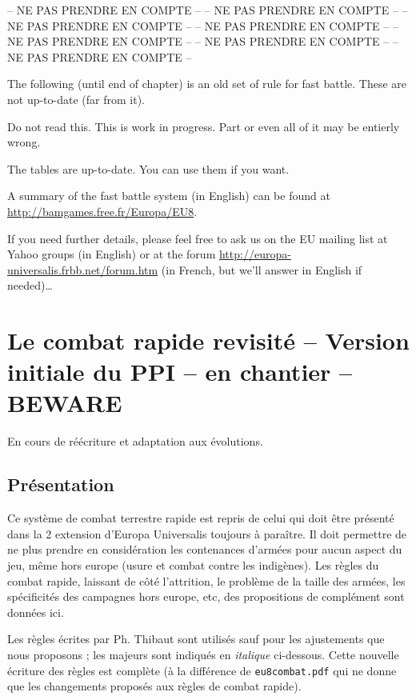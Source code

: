 
-- NE PAS PRENDRE EN COMPTE --
-- NE PAS PRENDRE EN COMPTE --
-- NE PAS PRENDRE EN COMPTE --
-- NE PAS PRENDRE EN COMPTE --
-- NE PAS PRENDRE EN COMPTE --
-- NE PAS PRENDRE EN COMPTE --
-- NE PAS PRENDRE EN COMPTE --

\begin{designnote}
The following (until end of chapter) is an old set of rule for fast
battle. These are not up-to-date (far from it).

Do not read this. This is work in progress. Part or even all of it may be
entierly wrong.

The tables are up-to-date. You can use them if you want.

A summary of the fast battle system (in English) can be found at
\url{http://bamgames.free.fr/Europa/EU8}.

If you need further details, please feel free to ask us on the EU mailing list
at Yahoo groups (in English) or at the forum
\url{http://europa-universalis.frbb.net/forum.htm} (in French, but we'll
answer in English if needed)\ldots
\end{designnote}

\section{Le combat rapide revisité -- Version initiale du PPI -- en chantier -- BEWARE}

En cours de réécriture et adaptation aux évolutions.

\subsection{Présentation}

Ce système de combat terrestre rapide est repris de celui qui doit être présenté 
dans la 2 extension d'Europa Universalis toujours à paraître. Il doit 
permettre de ne plus prendre en considération les contenances d'armées 
pour aucun aspect du jeu, même hors europe (usure et combat contre les 
indigènes). Les règles du combat rapide, laissant de côté l'attrition, le 
problème de la taille des armées, les spécificités des campagnes hors europe, 
etc, des propositions de complément sont données ici. 


Les règles écrites par Ph. Thibaut sont utilisés sauf pour les ajustements
que nous proposons ; les majeurs sont indiqués
en \textit{italique} ci-dessous.
Cette nouvelle écriture des règles est complète (à la différence de 
\texttt{eu8combat.pdf} qui ne donne que les changements proposés aux règles
de combat rapide).

